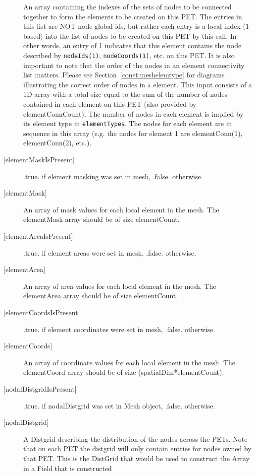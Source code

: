 \begin{description}
           An array containing the indexes of the sets of nodes to be connected together to form the
           elements to be created on this PET. The entries in this list are NOT node global ids,
           but rather each entry is a local index (1 based) into the list of nodes to be
           created on this PET by this call.
           In other words, an entry of 1 indicates that this element contains the node
           described by {\tt nodeIds(1)}, {\tt nodeCoords(1)}, etc. on this PET. It is also
           important to note that the order of the nodes in an element connectivity list
           matters. Please see Section~\ref{const:meshelemtype} for diagrams illustrating
           the correct order of nodes in a element. This input consists of a 1D array with
           a total size equal to the sum of the number of nodes contained in each element on
           this PET (also provided by elementConnCount). The number of nodes in each element 
           is implied by its element type in
           {\tt elementTypes}. The nodes for each element
           are in sequence in this array (e.g. the nodes for element 1 are elementConn(1),
           elementConn(2), etc.).
   \item [{[elementMaskIsPresent]}]
   .true. if element masking was set in mesh, .false. otherwise.
   \item [{[elementMask]}]
   An array of mask values for each local element in the mesh. The elementMask array should be of size elementCount.
   \item [{[elementAreaIsPresent]}]
   .true. if element areas were set in mesh, .false. otherwise.
   \item [{[elementArea]}]
   An array of area values for each local element in the mesh. The elementArea array should be of size elementCount.
   \item [{[elementCoordsIsPresent]}]
   .true. if element coordinates were set in mesh, .false. otherwise.
   \item [{[elementCoords]}]
   An array of coordinate values for each local element in the mesh. The elementCoord array should be of size (spatialDim*elementCount).
   \item [{[nodalDistgridIsPresent]}]
   .true. if nodalDistgrid was set in Mesh object, .false. otherwise.
   \item [{[nodalDistgrid]}]
   A Distgrid describing the distribution of the nodes across the PETs. Note that
   on each PET the distgrid will only contain entries for nodes owned by that PET.
   This is the DistGrid that would be used to construct the Array in a Field that is constructed

\end{description}
